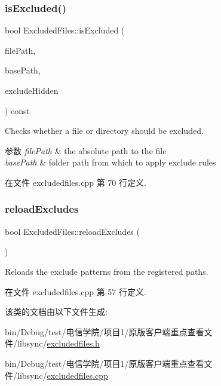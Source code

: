 \mbox{\label{class_o_c_c_1_1_excluded_files_ae54a8228ca921d2b859c6bc22c897302}} 
\subsubsection{\texorpdfstring{is\+Excluded()}{isExcluded()}}
{\footnotesize\ttfamily bool Excluded\+Files\+::is\+Excluded (\begin{DoxyParamCaption}\item[{const Q\+String \&}]{file\+Path,  }\item[{const Q\+String \&}]{base\+Path,  }\item[{bool}]{exclude\+Hidden }\end{DoxyParamCaption}) const}

Checks whether a file or directory should be excluded.


\begin{DoxyParams}{参数}
{\em file\+Path} & the absolute path to the file \\
\hline
{\em base\+Path} & folder path from which to apply exclude rules \\
\hline
\end{DoxyParams}


在文件 excludedfiles.\+cpp 第 70 行定义.

\mbox{\label{class_o_c_c_1_1_excluded_files_a725cf3074415738e3e2a4cc5aa881ef4}} 
\subsubsection{\texorpdfstring{reload\+Excludes}{reloadExcludes}}
{\footnotesize\ttfamily bool Excluded\+Files\+::reload\+Excludes (\begin{DoxyParamCaption}{ }\end{DoxyParamCaption})\hspace{0.3cm}{\ttfamily [slot]}}

Reloads the exclude patterns from the registered paths. 

在文件 excludedfiles.\+cpp 第 57 行定义.



该类的文档由以下文件生成\+:\begin{DoxyCompactItemize}
\item 
bin/\+Debug/test/电信学院/项目1/原版客户端重点查看文件/libsync/\hyperlink{excludedfiles_8h}{excludedfiles.\+h}\item 
bin/\+Debug/test/电信学院/项目1/原版客户端重点查看文件/libsync/\hyperlink{excludedfiles_8cpp}{excludedfiles.\+cpp}\end{DoxyCompactItemize}
